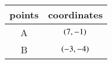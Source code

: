 \begin{tabular}[12pt]{ |c| |c|}
  \hline
  \textbf{points}&\textbf{coordinates}\\
  \hline
  A & $\left(7,-1\right)$\\
  \hline
  B & $\left(-3,-4\right)$\\
  \hline
  \end{tabular}
